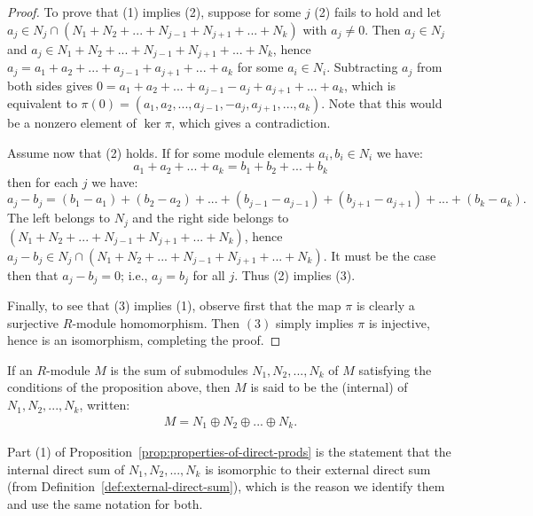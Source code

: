     \begin{proof}
        To prove that (1) implies (2), suppose for some $j$ (2) fails to hold and let $a_j \in N_j \cap (N_1 + N_2 + ... + N_{j-1} + N_{j+1} + ... + N_k)$ with $a_j \neq 0$. Then $a_j \in N_j$ and $a_j \in N_1 + N_2 + ... + N_{j-1} + N_{j+1} + ... + N_k$, hence $a_j = a_1 + a_2 + ... + a_{j-1} + a_{j+1} + ... + a_k$ for some $a_i \in N_i$. Subtracting $a_j$ from both sides gives $0 = a_1 + a_2 + ... + a_{j-1} -a_j + a_{j+1} + ... + a_k$, which is equivalent to $\pi(0) = (a_1,a_2,...,a_{j-1},-a_j,a_{j+1},...,a_k)$. Note that this would be a nonzero element of $\ker{\pi}$, which gives a contradiction.

        Assume now that (2) holds. If for some module elements $a_i , b_i \in N_i$ we have: $$a_1+a_2+...+a_k = b_1+b_2+...+b_k$$ then for each $j$ we have: $$a_j - b_j = (b_1 - a_1)+ (b_2 - a_2)+ ... + (b_{j-1} - a_{j-1}) + (b_{j+1} - a_{j+1}) + ... + (b_k - a_k).$$ The left belongs to $N_j$ and the right side belongs to $(N_1 + N_2 + ... + N_{j-1} + N_{j+1} + ... + N_k)$, hence $a_j - b_j \in N_j \cap (N_1 + N_2 + ... + N_{j-1} + N_{j+1} + ... + N_k)$. It must be the case then that $a_j - b_j = 0$; i.e., $a_j = b_j$ for all $j$. Thus (2) implies (3).

        Finally, to see that (3) implies (1), observe first that the map $\pi$ is clearly a surjective $R$-module homomorphism. Then $(3)$ simply implies $\pi$ is injective, hence is an isomorphism, completing the proof.
    \end{proof}

    \begin{definition}\label{def:internal-direct-sum}
        If an $R$-module $M$ is the sum of submodules $N_1, N_2, ... , N_k$ of $M$ satisfying the conditions of the proposition above, then $M$ is said to be the (internal)  of $N_1, N_2, ..., N_k$, written:
            \begin{equation*}
            \begin{split}
                M = N_1 \oplus N_2 \oplus ... \oplus N_k.
            \end{split}
            \end{equation*}
    \end{definition}

    \begin{note}
        Part (1) of Proposition~\ref{prop:properties-of-direct-prods} is the statement that the internal direct sum of $N_1,N_2,...,N_k$ is isomorphic to their external direct sum (from Definition~\ref{def:external-direct-sum}), which is the reason we identify them and use the same notation for both.
    \end{note}

